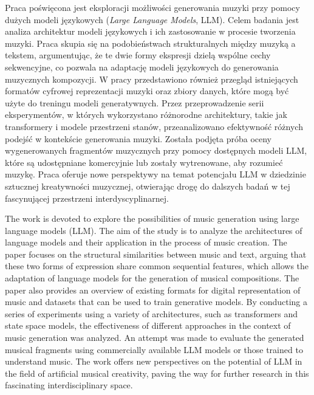 \documentclass[data-science]{agh-wi} %
\author{Filip Ręka}
\begin{document}
\frontmatter %
\maketitle %

\begin{abstractPL}
    Praca poświęcona jest eksploracji możliwości generowania muzyki przy pomocy dużych modeli językowych (\textit{Large Language Models}, LLM). Celem badania jest analiza architektur modeli językowych i ich zastosowanie w procesie tworzenia muzyki. Praca skupia się na podobieństwach strukturalnych między muzyką a tekstem, argumentując, że te dwie formy ekspresji dzielą wspólne cechy sekwencyjne, co pozwala na adaptację modeli językowych do generowania muzycznych kompozycji. W pracy przedstawiono również przegląd istniejących formatów cyfrowej reprezentacji muzyki oraz zbiory danych, które mogą być użyte do treningu modeli generatywnych. Przez przeprowadzenie serii eksperymentów, w których wykorzystano różnorodne architektury, takie jak transformery i modele przestrzeni stanów, przeanalizowano efektywność różnych podejść w kontekście generowania muzyki. Została podjęta próba oceny wygenerowanych fragmentów muzycznych przy pomocy dostępnych modeli LLM, które są udostępniane komercyjnie lub zostały wytrenowane, aby rozumieć muzykę. Praca oferuje nowe perspektywy na temat potencjału LLM w dziedzinie sztucznej kreatywności muzycznej, otwierając drogę do dalszych badań w tej fascynującej przestrzeni interdyscyplinarnej.
\end{abstractPL}
\begin{abstractEN}
    The work is devoted to explore the possibilities of music generation using large language models (LLM). The aim of the study is to analyze the architectures of language models and their application in the process of music creation. The paper focuses on the structural similarities between music and text, arguing that these two forms of expression share common sequential features, which allows the adaptation of language models for the generation of musical compositions. The paper also provides an overview of existing formats for digital representation of music and datasets that can be used to train generative models. By conducting a series of experiments using a variety of architectures, such as transformers and state space models, the effectiveness of different approaches in the context of music generation was analyzed. An attempt was made to evaluate the generated musical fragments using commercially available LLM models or those trained to understand music. The work offers new perspectives on the potential of LLM in the field of artificial musical creativity, paving the way for further research in this fascinating interdisciplinary space.
\end{abstractEN}
\end{document}

